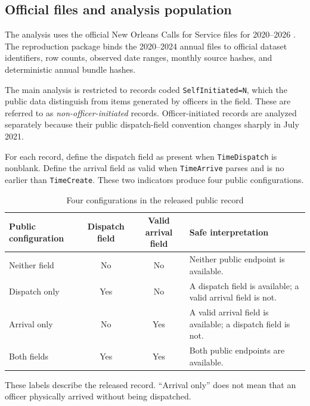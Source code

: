 \documentclass[11pt]{article}
\begin{document}
\subsection{Official files and analysis population}

The analysis uses the official New Orleans Calls for Service files for 2020--2026 \citep{DataNOLA2020,DataNOLA2021,DataNOLA2022,DataNOLA2023,DataNOLA2024,DataNOLA2025,DataNOLA2026}. The reproduction package binds the 2020--2024 annual files to official dataset identifiers, row counts, observed date ranges, monthly source hashes, and deterministic annual bundle hashes.

The main analysis is restricted to records coded \texttt{SelfInitiated=N}, which the public data distinguish from items generated by officers in the field. These are referred to as \emph{non-officer-initiated} records. Officer-initiated records are analyzed separately because their public dispatch-field convention changes sharply in July 2021.

For each record, define the dispatch field as present when \texttt{TimeDispatch} is nonblank. Define the arrival field as valid when \texttt{TimeArrive} parses and is no earlier than \texttt{TimeCreate}. These two indicators produce four public configurations.

\begin{table}[!htbp]
\centering
\caption{Four configurations in the released public record}
\label{tab:states}
\begin{tabularx}{\textwidth}{@{}lccX@{}}
\toprule
Public configuration & Dispatch field & Valid arrival field & Safe interpretation \\
\midrule
Neither field & No & No & Neither public endpoint is available. \\
Dispatch only & Yes & No & A dispatch field is available; a valid arrival field is not. \\
Arrival only & No & Yes & A valid arrival field is available; a dispatch field is not. \\
Both fields & Yes & Yes & Both public endpoints are available. \\
\bottomrule
\end{tabularx}
\begin{minipage}{0.96\textwidth}\footnotesize
These labels describe the released record. ``Arrival only'' does not mean that an officer physically arrived without being dispatched.
\end{minipage}
\end{table}
\end{document}
